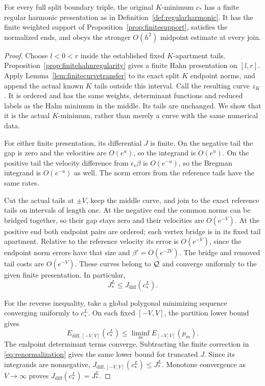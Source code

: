 \begin{theorem}\label{thm:finitealgebraicminimum}
For every full split boundary triple, the original $K$-minimum
$c_*$ has a finite regular harmonic presentation as in
Definition~\ref{def:regularharmonic}. It has the finite weighted
support of Proposition~\ref{prop:finitesupport}, satisfies the
normalized ends, and obeys the stronger $O(h^2)$ midpoint estimate
at every join.
\end{theorem}

\begin{proof}
Choose $l<0<r$ inside the established fixed $K$-apartment tails.
Proposition~\ref{prop:finitehahnregularity} gives a finite Hahn
presentation on $[l,r]$. Apply
Lemma~\ref{lem:finitecurvetransfer} to its exact split $K$
endpoint norms, and append the actual known $K$ tails outside
this interval. Call the resulting curve $z_K$.
It is ordered and has the same weights, determinant functions
and reduced labels as the Hahn minimum in the middle. Its tails
are unchanged. We show that it is the actual $K$-minimum,
rather than merely a curve with the same numerical data.

For either finite presentation, its differential $J$ is finite.
On the negative tail the gap is zero and the velocities are
$O(e^u)$, so the integrand is $O(e^u)$. On the positive tail the
velocity difference from $\epsilon_v\beta$ is $O(e^{-u})$,
so the Bregman integrand is $O(e^{-u})$ as well. The norm errors
from the reference tails have the same rates.

Cut the actual tails at $\pm V$, keep the middle curve, and
join to the exact reference tails on intervals of length one.
At the negative end the common norms can be bridged together,
so their gap stays zero and their velocities are $O(e^{-V})$.
At the positive end both endpoint pairs are ordered; each
vertex bridge is in its fixed tail apartment. Relative to the
reference velocity its error is $O(e^{-V})$, since the endpoint
norm errors have that size and $\beta'=O(e^{-2V})$.
The bridge and removed tail costs are $O(e^{-V})$. These curves
belong to $\mathcal Q$ and converge uniformly to the given finite
presentation. In particular,
\[
 J_*^L\le J_{\mathrm{diff}}(c_*^L).
\]

For the reverse inequality, take a global polygonal minimizing
sequence converging uniformly to $c_*^L$. On each fixed
$[-V,V]$, the partition lower bound gives
\[
 E_{\mathrm{diff},[-V,V]}(c_*^L)
       \le\liminf_m E_{[-V,V]}(p_m).
\]
The endpoint determinant terms converge. Subtracting the finite
correction in \eqref{eq:renormalization} gives the same lower
bound for truncated $J$. Since its integrands are nonnegative,
$J_{\mathrm{diff},[-V,V]}(c_*^L)\le J_*^L$.
Monotone convergence as $V\to\infty$ proves
$J_{\mathrm{diff}}(c_*^L)=J_*^L$.


\end{proof}
